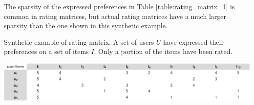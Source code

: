 The sparsity of the expressed preferences in Table \ref{table:rating_matrix_1} is common in rating matrices, but actual rating matrices have a much larger sparsity than the one shown in this synthetic example. 

\begin{table}[!ht]
\vspace{1em}
\centering
\caption[Synthetic example of rating matrix]{Synthetic example of rating matrix. A set of users $U$ have expressed their preferences on a set of items $I$. Only a portion of the items have been rated.}\label{table:rating_matrix_1}
\includegraphics[width = 1.0\textwidth]{rating_matrix_1.pdf}
\end{table}



